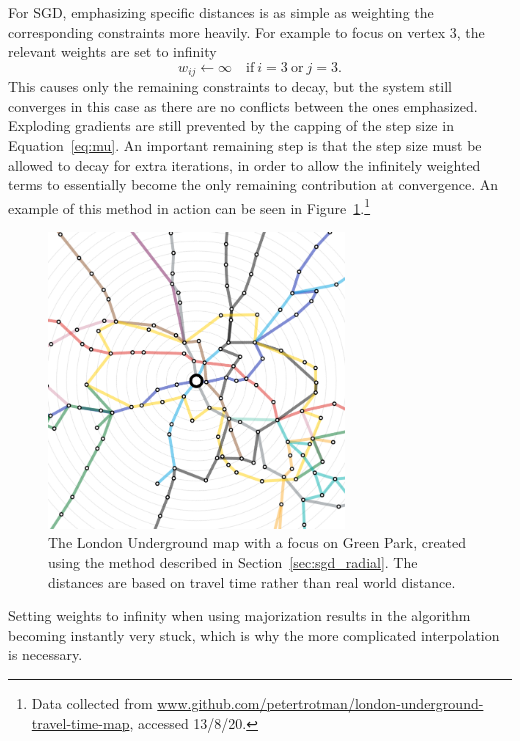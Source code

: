 For SGD, emphasizing specific distances is as simple as weighting the corresponding constraints more heavily.
For example to focus on vertex 3, the relevant weights are set to infinity
\begin{equation}
  w_{ij} \leftarrow \infty \quad \text{if}\ i=3\ \text{or}\ j=3.
\end{equation}
This causes only the remaining constraints to decay, but the system still converges in this case as there are no conflicts between the ones emphasized. Exploding gradients are still prevented by the capping of the step size in Equation~\eqref{eq:mu}.
An important remaining step is that the step size must be allowed to decay for extra iterations, in order to allow the infinitely weighted terms to essentially become the only remaining contribution at convergence. 
An example of this method in action can be seen in Figure~\ref{fig:tube}.\footnote{Data collected from
\url{www.github.com/petertrotman/london-underground-travel-time-map}, accessed 13/8/20.}

\begin{figure}
  \centering
  \includegraphics[width=0.7\textwidth]{stress/tube.png}
  \caption[The London tube map with a focus on Green Park station]{The London Underground map with a focus on Green Park, created using the method described in Section~\ref{sec:sgd_radial}. The distances are based on travel time rather than real world distance.}
  \label{fig:tube}
\end{figure}

Setting weights to infinity when using majorization results in the algorithm becoming instantly very stuck, which is why the more complicated interpolation \citep{Brandes2011} is necessary.

